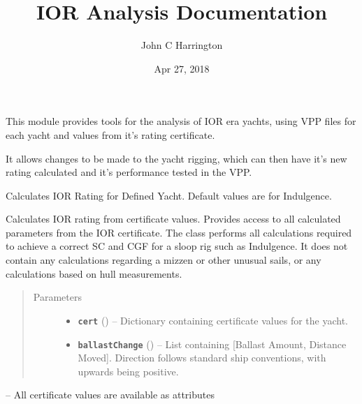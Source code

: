 \documentclass[letterpaper,10pt,english]{sphinxmanual}
\title{IOR Analysis Documentation}
\date{Apr 27, 2018}
\author{John C Harrington}
\begin{document}
\maketitle
\tableofcontents
{}\label{index::doc}

This module provides tools for the analysis of IOR era yachts,
using VPP files for each yacht and values from it's rating
certificate.

It allows changes to be made to the yacht rigging, which can
then have it's new rating calculated and it's performance
tested in the VPP.

\begin{fulllineitems}
\label{index:IORAnalysis.IOR}
Calculates IOR Rating for Defined Yacht.
Default values are for Indulgence.

Calculates IOR rating from certificate values.
Provides access to all calculated parameters from the IOR
certificate.
The class performs all calculations required to achieve a
correct SC and CGF for a sloop rig such as Indulgence. It
does not contain any calculations regarding a mizzen or other
unusual sails, or any calculations based on hull measurements.
\begin{quote}\begin{description}
\item[{Parameters}] \leavevmode\begin{itemize}
\item {} 
\textbf{\texttt{cert}} () -- Dictionary containing certificate values for the yacht.

\item {} 
\textbf{\texttt{ballastChange}} () -- List containing {[}Ballast Amount, Distance  Moved{]}.
Direction follows standard ship conventions, with
upwards being positive.

\end{itemize}

\end{description}\end{quote}


\begin{fulllineitems}
 -- All certificate values are available as attributes

\end{fulllineitems}


\end{fulllineitems}
\end{document}
